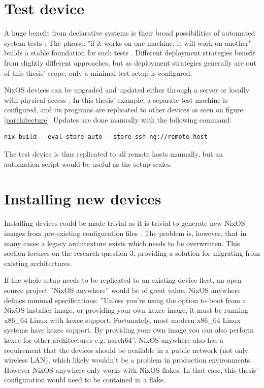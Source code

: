 \section{Test device}

A huge benefit from declarative systems is their broad possibilities
of automated system tests \cite{van2010automating}. The phrase: "if it
works on one machine, it will work on another" builds a stable
foundation for such tests \cite{nixosNixOSManual}. Different
deployment strategies benefit from slightly different approaches, but
as deployment strategies generally are out of this thesis' scope, only
a minimal test setup is configured.

NixOS devices can be upgraded and updated either through a server or locally
with physical access \cite{nixosNixOSManual}. In this thesis' example,
a separate test machine is configured, and its programs are
replicated to other devices as seen on figure
\ref{parchitecture}. Updates are done manually with the following command:

\begin{lstlisting}
nix build --eval-store auto --store ssh-ng://remote-host
\end{lstlisting}

The test device is thus replicated to all remote hosts manually, but
an automation script would be useful as the setup scales.

\section{Installing new devices} \label{instnewdevices}

Installing devices could be made trivial as it is trivial to generate new
NixOS images from pre-existing configuration files
\cite{nixosNixOSManual}. The problem is, however, that in many cases a
legacy architexture exists which needs to be overwritten. This
section focuses on the research question 3, providing a solution for
migrating from existing architectures.

If the whole setup needs to be replicated to an existing device fleet,
an open source project ''NixOS anywhere'' would be of great value. NixOS
anywhere defines minimal specifications: ''Unless you're using the
option to boot from a NixOS installer image, or providing your own
kexec image, it must be running x86\_64 Linux with kexec
support. Fortunately, most modern x86\_64 Linux systems have kexec
support. By providing your own image you can also perform kexec for
other architectures e.g. aarch64''. NixOS anywhere also has a
requirement that the devices should be available in a public network
(not only wireless LAN), which likely wouldn't be a problem in
production environments. However NixOS anywhere  only works with NixOS
flakes. In that case, this thesis' configuration would need to be contained in a
flake. \cite{githubGitHubNixcommunitynixosanywhere}

